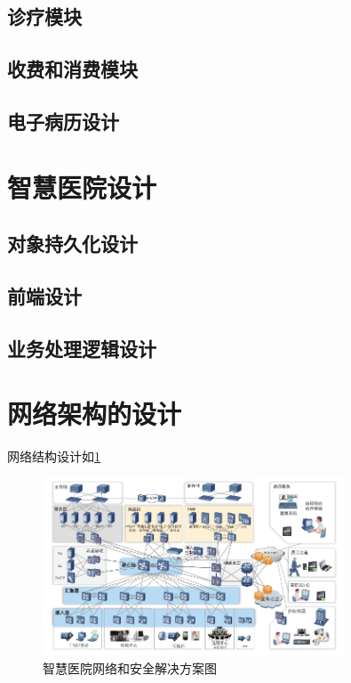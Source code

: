 \documentclass[doctor,secret]{thuthesis}
\begin{document}
\subsection{诊疗模块}
\label{sec:org90310d1}
\subsection{收费和消费模块}
\label{sec:orgf2e6cbe}
\subsection{电子病历设计}
\label{sec:orga67777c}
\section{智慧医院设计}
\label{sec:orga692e6f}
\subsection{对象持久化设计}
\label{sec:orgd5109b3}
\subsection{前端设计}
\label{sec:org174164b}
\subsection{业务处理逻辑设计}
\label{sec:org242a0cc}
\section{网络架构的设计}
\label{sec:org1b7c050}
网络结构设计如\ref{fig:networkscheme}

\begin{figure}[htbp]
\centering
\includegraphics[width=0.8\textwidth]{figures/network.pdf}
\caption{智慧医院网络和安全解决方案图 \label{fig:networkscheme}}
\end{figure}
\end{document}
